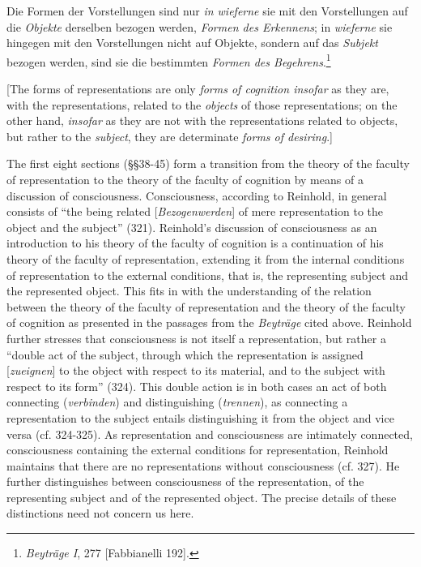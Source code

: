 Die Formen der Vorstellungen sind nur \textit{in wieferne} sie mit den Vorstellungen auf die \textit{Objekte} derselben bezogen werden, \textit{Formen des Erkennens}; in \textit{wieferne} sie hingegen mit den Vorstellungen nicht auf Objekte, sondern auf das \textit{Subjekt} bezogen werden, sind sie die bestimmten \textit{Formen des Begehrens}.\footnote{ \textit{Beytr\"{a}ge I}, 277 [Fabbianelli 192].}

[The forms of representations are only \textit{forms of cognition insofar} as they are, with the representations, related to the \textit{objects }of those representations; on the other hand, \textit{insofar} as they are not with the representations related to objects, but rather to the \textit{subject}, they are determinate \textit{forms of desiring}.] 

The first eight sections (\S \S  38{-}45) form a transition from the theory of the faculty of representation to the theory of the faculty of cognition by means of a discussion of consciousness. Consciousness, according to Reinhold, in general consists of ``the being related [\textit{Bezogenwerden}] of mere representation to the object and the subject'' (321). Reinhold's discussion of consciousness as an introduction to his theory of the faculty of cognition is a continuation of his theory of the faculty of representation, extending it from the internal conditions of representation to the external conditions, that is, the representing subject and the represented object. This fits in with the understanding of the relation between the theory of the faculty of representation and the theory of the faculty of cognition as presented in the passages from the \textit{Beytr\"{a}ge }cited above. Reinhold further stresses that consciousness is not itself a representation, but rather a ``double act of the subject, through which the representation is assigned [\textit{zueignen}] to the object with respect to its material, and to the subject with respect to its form'' (324). This double action is in both cases an act of both connecting (\textit{verbinden}) and distinguishing (\textit{trennen}), as connecting a representation to the subject entails distinguishing it from the object and vice versa (cf. 324{-}325). As representation and consciousness are intimately connected, consciousness containing the external conditions for representation, Reinhold maintains that there are no representations without consciousness (cf. 327). He further distinguishes between consciousness of the representation, of the representing subject and of the represented object. The precise details of these distinctions need not concern us here. 

